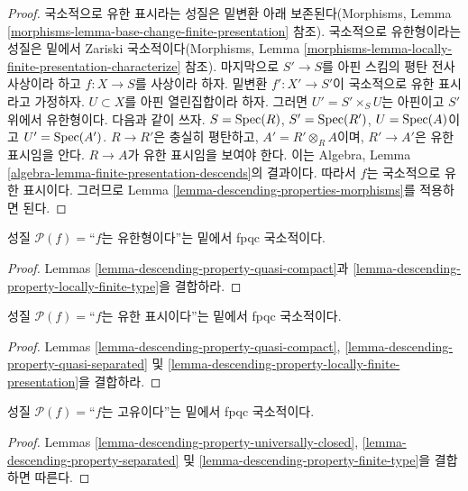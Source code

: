 \begin{proof}
국소적으로 유한 표시라는 성질은 밑변환 아래 보존된다(Morphisms, Lemma
\ref{morphisms-lemma-base-change-finite-presentation} 참조).
국소적으로 유한형이라는 성질은 밑에서 Zariski 국소적이다(Morphisms,
Lemma \ref{morphisms-lemma-locally-finite-presentation-characterize}
참조).
마지막으로 $S' \to S$를 아핀 스킴의 평탄 전사 사상이라 하고
$f : X \to S$를 사상이라 하자. 밑변환 $f' : X' \to S'$이 국소적으로
유한 표시라고 가정하자. $U \subset X$를 아핀 열린집합이라 하자. 그러면
$U' = S' \times_S U$는 아핀이고 $S'$ 위에서 유한형이다. 다음과 같이
쓰자.
$S = \mathop{\mathrm{Spec}}(R)$,
$S' = \mathop{\mathrm{Spec}}(R')$,
$U = \mathop{\mathrm{Spec}}(A)$이고
$U' = \mathop{\mathrm{Spec}}(A')$.
$R \to R'$은 충실히 평탄하고, $A' = R' \otimes_R A$이며,
$R' \to A'$은 유한 표시임을 안다. $R \to A$가 유한 표시임을 보여야
한다. 이는 Algebra, Lemma
\ref{algebra-lemma-finite-presentation-descends}의 결과이다. 따라서
$f$는 국소적으로 유한 표시이다. 그러므로 Lemma
\ref{lemma-descending-properties-morphisms}를 적용하면 된다.
\end{proof}

\begin{lemma}
\label{lemma-descending-property-finite-type}
성질 $\mathcal{P}(f) =$“$f$는 유한형이다”는 밑에서 fpqc 국소적이다.
\end{lemma}

\begin{proof}
Lemmas \ref{lemma-descending-property-quasi-compact}과
\ref{lemma-descending-property-locally-finite-type}을 결합하라.
\end{proof}

\begin{lemma}
\label{lemma-descending-property-finite-presentation}
성질 $\mathcal{P}(f) =$“$f$는 유한 표시이다”는 밑에서 fpqc 국소적이다.
\end{lemma}

\begin{proof}
Lemmas \ref{lemma-descending-property-quasi-compact},
\ref{lemma-descending-property-quasi-separated} 및
\ref{lemma-descending-property-locally-finite-presentation}을 결합하라.
\end{proof}

\begin{lemma}
\label{lemma-descending-property-proper}
성질 $\mathcal{P}(f) =$“$f$는 고유이다”는 밑에서 fpqc 국소적이다.
\end{lemma}

\begin{proof}
Lemmas \ref{lemma-descending-property-universally-closed},
\ref{lemma-descending-property-separated} 및
\ref{lemma-descending-property-finite-type}을 결합하면 따른다.
\end{proof}

